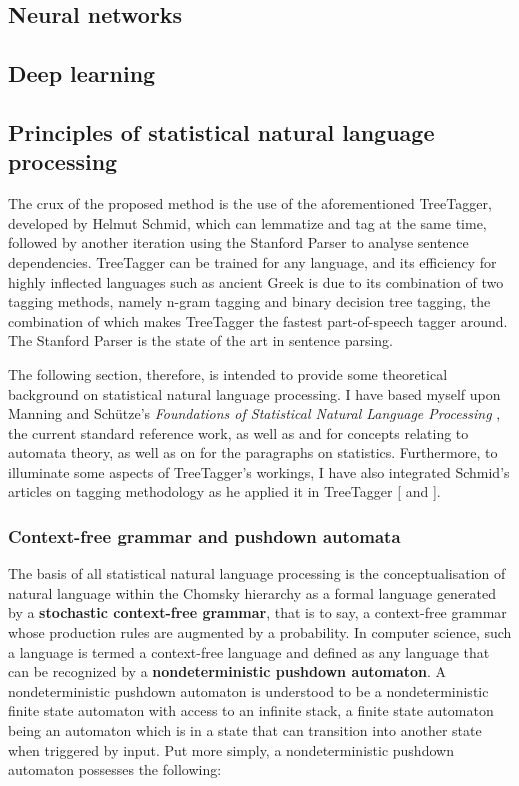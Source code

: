 \subsection{Neural networks}
\label{sec:neuralnetworks}

\subsection{Deep learning}
\label{sec:neuralnetworks}

\subsection{Principles of statistical natural language processing} 
\label{sub:principles-nlp}

The crux of the proposed method is the use of the aforementioned TreeTagger,
developed by Helmut Schmid, which can lemmatize and tag at the same time,
followed by another iteration using the Stanford Parser to analyse sentence
dependencies. TreeTagger can be trained for any language, and its efficiency
for highly inflected languages such as ancient Greek is due to its combination
of two tagging methods, namely n-gram tagging and binary decision tree tagging,
the combination of which makes TreeTagger the fastest part-of-speech tagger
around. The Stanford Parser is the state of the art in sentence parsing.

The following section, therefore, is intended to provide some theoretical
background on statistical natural language processing. I have based myself upon
Manning and Schütze's \textit{Foundations of Statistical Natural Language
Processing} \citep{manning1999}, the current standard reference work, as well
as \citet{koshy2004} and \citet{hopcroft2001} for concepts relating to automata
theory, as well as on \citet{bod2004} for the paragraphs on statistics.
Furthermore, to illuminate some aspects of TreeTagger's workings, I have also
integrated Schmid's articles on tagging methodology as he applied it in
TreeTagger [\citeyear{schmid1994} and \citeyear{schmid1995}]. 

\subsubsection{Context-free grammar and pushdown automata} %
\label{sub:formallang}

The basis of all statistical natural language processing is the
conceptualisation of natural language within the Chomsky hierarchy as a formal
language generated by a \textbf{stochastic context-free grammar}, that is to say, a
context-free grammar whose production rules are augmented by a probability. In
computer science, such a language is termed a context-free language and defined
as any language that can be recognized by a \textbf{nondeterministic pushdown
automaton}. A nondeterministic pushdown automaton is understood to be a
nondeterministic finite state automaton with access to an infinite stack, a
finite state automaton being an automaton which is in a state that can
transition into another state when triggered by input. Put more simply, a
nondeterministic pushdown automaton possesses the following:

